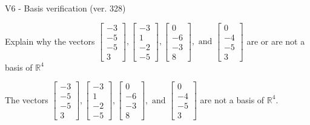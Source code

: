 \begin{exercise}
  \begin{exerciseTitle}V6 - Basis verification (ver. 328)\end{exerciseTitle}
  \begin{exerciseStatement}
    Explain why the vectors \(\left[\begin{array}{r}
-3 \\
-5 \\
-5 \\
3
\end{array}\right] , \left[\begin{array}{r}
-3 \\
1 \\
-2 \\
-5
\end{array}\right] , \left[\begin{array}{r}
0 \\
-6 \\
-3 \\
8
\end{array}\right] , \text{ and } \left[\begin{array}{r}
0 \\
-4 \\
-5 \\
3
\end{array}\right]\) are or are not a basis of \(\mathbb{R}^4\)	


  \end{exerciseStatement}
  \begin{exerciseAnswer}
   The vectors \(\left[\begin{array}{r}
-3 \\
-5 \\
-5 \\
3
\end{array}\right] , \left[\begin{array}{r}
-3 \\
1 \\
-2 \\
-5
\end{array}\right] , \left[\begin{array}{r}
0 \\
-6 \\
-3 \\
8
\end{array}\right] , \text{ and } \left[\begin{array}{r}
0 \\
-4 \\
-5 \\
3
\end{array}\right]\) 
  	 are not  a basis of \(\mathbb{R}^4\).
  


  \end{exerciseAnswer}
\end{exercise}